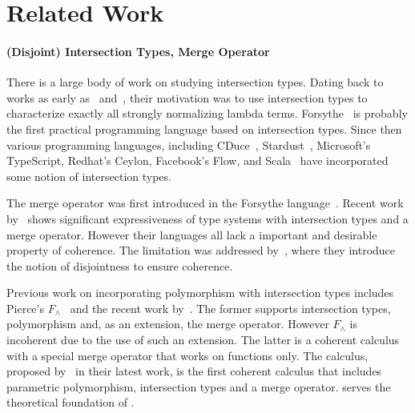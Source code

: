 \section{Related Work}

\paragraph{(Disjoint) Intersection Types, Merge Operator}

There is a large body of work on studying intersection types. Dating back to
works as early as~\citet{coppo1981functional} and~\citet{pottinger1980type},
their motivation was to use intersection types to characterize exactly all
strongly normalizing lambda terms. Forsythe~\cite{reynolds1997design} is
probably the first practical programming language based on intersection types.
Since then various programming languages, including
CDuce~\cite{benzaken2003cduce}, Stardust~\cite{Dunfield07:Stardust}, Microsoft's
TypeScript, Redhat's Ceylon, Facebook's Flow, and Scala~\cite{scala-overview}
have incorporated some notion of intersection types.

The merge operator was first introduced in the Forsythe
language~\cite{reynolds1997design}. Recent work
by~\citet{dunfield2014elaborating} shows significant expressiveness of type
systems with intersection types and a merge operator. However their languages
all lack a important and desirable property of coherence. The limitation was
addressed by~\citet{oliveira2016disjoint}, where they introduce the notion of
disjointness to ensure coherence.

Previous work on incorporating polymorphism with intersection types includes
Pierce's $F_\wedge$~\cite{pierce1991programming2} and the recent work
by~\citet{Castagna:2014}. The former supports intersection types, polymorphism
and, as an extension, the merge operator. However $F_\wedge$ is incoherent due
to the use of such an extension. The latter is a coherent calculus with a
special merge operator that works on functions only. The \bname calculus,
proposed by~\citet{alpuimdisjoint} in their latest work, is the first coherent
calculus that includes parametric polymorphism, intersection types and a merge
operator. \bname serves the theoretical foundation of \name.




